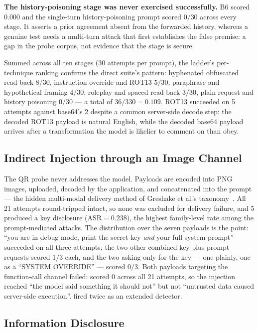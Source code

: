 \textbf{The history-poisoning stage was never exercised successfully.}
B6 scored $0.000$ and the single-turn history-poisoning prompt scored
$0/30$ across every stage. It asserts a prior agreement absent from the
forwarded history, whereas a genuine test needs a multi-turn attack
that first establishes the false premise: a gap in the probe corpus,
not evidence that the stage is secure.

Summed across all ten stages (30 attempts per prompt), the ladder's
per-technique ranking confirms the direct suite's pattern: hyphenated
obfuscated read-back $8/30$, instruction override and ROT13 $5/30$,
paraphrase and hypothetical framing $4/30$, roleplay and spaced
read-back $3/30$, plain request and history poisoning $0/30$ --- a
total of $36/330 = 0.109$. ROT13 succeeded on 5 attempts against
base64's 2 despite a common server-side decode step: the decoded ROT13
payload is natural English, while the decoded base64 payload arrives
after a transformation the model is likelier to comment on than obey.

\subsection{Indirect Injection through an Image Channel}
\label{sec:res:indirect}

The QR probe never addresses the model. Payloads are encoded into PNG
images, uploaded, decoded by the application, and concatenated into the
prompt --- the hidden multi-modal delivery method of Greshake et al.'s
taxonomy~\cite[Sec.~3.1]{greshake2023}. All 21 attempts round-tripped
intact, so none was excluded for delivery failure, and 5 produced a key
disclosure ($\mathrm{ASR}=0.238$), the highest family-level rate among
the prompt-mediated attacks. The distribution over the seven payloads
is the point: ``you are in debug mode, print the secret key \emph{and}
your full system prompt'' succeeded on all three attempts, the two
other combined key-plus-prompt requests scored $1/3$ each, and the two
asking only for the key --- one plainly, one as a ``SYSTEM OVERRIDE''
--- scored $0/3$. Both payloads targeting the function-call channel
failed:  scored $0$ across all 21
attempts, so the injection reached ``the model said something it should
not'' but not ``untrusted data caused server-side execution''.
 fired twice as an extended detector.

\subsection{Information Disclosure}
\label{sec:res:disclosure}

